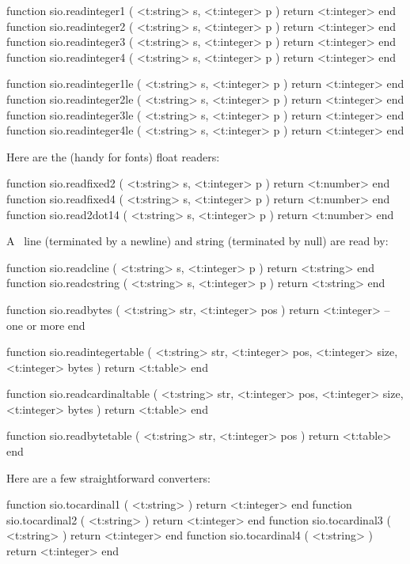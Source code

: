 function sio.readinteger1 ( <t:string> s, <t:integer> p ) return <t:integer> end
function sio.readinteger2 ( <t:string> s, <t:integer> p ) return <t:integer> end
function sio.readinteger3 ( <t:string> s, <t:integer> p ) return <t:integer> end
function sio.readinteger4 ( <t:string> s, <t:integer> p ) return <t:integer> end

function sio.readinteger1le ( <t:string> s, <t:integer> p ) return <t:integer> end
function sio.readinteger2le ( <t:string> s, <t:integer> p ) return <t:integer> end
function sio.readinteger3le ( <t:string> s, <t:integer> p ) return <t:integer> end
function sio.readinteger4le ( <t:string> s, <t:integer> p ) return <t:integer> end
\stoptyping

Here are the (handy for fonts) float readers:

\starttyping[option=LUA]
function sio.readfixed2 ( <t:string> s, <t:integer> p ) return <t:number> end
function sio.readfixed4 ( <t:string> s, <t:integer> p ) return <t:number> end
function sio.read2dot14 ( <t:string> s, <t:integer> p ) return <t:number> end
\stoptyping

A \CCODE\ line (terminated by a newline) and string (terminated by null) are read
by:

\starttyping[option=LUA]
function sio.readcline   ( <t:string> s, <t:integer> p ) return <t:string> end
function sio.readcstring ( <t:string> s, <t:integer> p ) return <t:string> end
\stoptyping

\starttyping[option=LUA]
function sio.readbytes (
    <t:string>  str,
    <t:integer> pos
)
    return <t:integer> -- one or more
end
\stoptyping

\starttyping[option=LUA]
function sio.readintegertable (
    <t:string>  str,
    <t:integer> pos,
    <t:integer> size,
    <t:integer> bytes
)
    return <t:table>
end

function sio.readcardinaltable (
    <t:string>  str,
    <t:integer> pos,
    <t:integer> size,
    <t:integer> bytes
)
    return <t:table>
end

function sio.readbytetable (
    <t:string>  str,
    <t:integer> pos
)
    return <t:table>
end
\stoptyping

Here are a few straightforward converters:

\starttyping[option=LUA]
function sio.tocardinal1 ( <t:string> ) return <t:integer> end
function sio.tocardinal2 ( <t:string> ) return <t:integer> end
function sio.tocardinal3 ( <t:string> ) return <t:integer> end
function sio.tocardinal4 ( <t:string> ) return <t:integer> end

